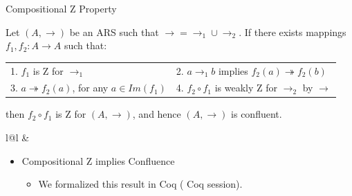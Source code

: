 \documentclass[10pt]{beamer}
\newcommand{\tto}{\twoheadrightarrow}
\begin{document}
\begin{frame}[fragile]{Compositional Z Property}
  \begin{definition}\label{def:zcomp}
  Let $(A,\to)$ be an ARS such that $\to = \to_1 \cup \to_2$. If there exists mappings $f_1,f_2: A \to A$ such that: \\[.05in]
  \begin{tabular}{ll}
  {\color{blue} 1.} $f_1$ is Z for $\to_1$ & {\color{blue} 2.} $a \to_1 b$ implies $f_2(a) \tto f_2(b)$ \\[.05in]
  {\color{blue} 3.} $a \tto f_2(a)$, for any $a\in Im(f_1)$ & {\color{blue} 4.} $f_2 \circ f_1$ is weakly Z for $\to_2$ by $\to$ \\[.05in]
  \end{tabular}
  then $f_2 \circ f_1$ is Z for $(A,\to)$, and hence $(A,\to)$
  is confluent.
  \begin{tabular}{l@{\hskip 1cm}l}
   &
\end{tabular}
\end{definition}
  \begin{itemize}
  \item Compositional Z implies Confluence~\cite{Nakazawa-Fujita2016}
    \begin{itemize}
    \item We formalized this result in Coq ({\color{blue} Coq session}).


    \end{itemize}
  \end{itemize}
\end{frame}
\end{document}
